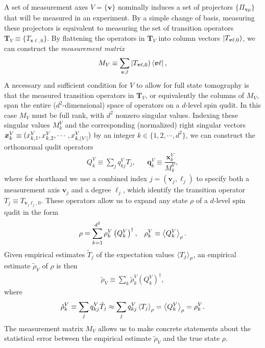 \documentclass[notitlepage,twocolumn]{revtex4-2}
\newcommand{\f}[2]{\dfrac{#1}{#2}} %
\newcommand{\p}[1]{\left(#1\right)} %
\newcommand{\bk}{\Braket} %
\renewcommand{\v}{\bm} %
\renewcommand{\set}[1]{\{#1\}} %
\def\oket#1{\mathinner{|{#1})}}
\begin{document}
A set of measurement axes $V=\set{\v v}$ nominally induces a set of projectors $\set{\Pi_{\v v\mu}}$ that will be measured in an experiment.
By a simple change of basis, measuring these projectors is equivalent to measuring the set of transition operators $\v T_V\equiv\set{T_{\v v\ell,0}}$.
By flattening the operators in $\v T_V$ into column vectors $\oket{T_{\v v\ell,0}}$, we can construct the {\it measurement matrix}
\begin{align}
  M_V \equiv \sum_{\v v,\ell} \oket{T_{\v v\ell,0}} \bra{\v v\ell},
  \label{eq:meas_mat}
\end{align}
A necessary and sufficient condition for $V$ to allow for full state tomography is that the measured transition operators in $\v T_V$, or equivalently the columns of $M_V$, span the entire ($d^2$-dimensional) space of operators on a $d$-level spin qudit.
In this case $M_V$ must be full rank, with $d^2$ nonzero singular values.
Indexing these singular values $M^V_k$ and the corresponding (normalized) right singular vectors $\v x^V_k\equiv(x^V_{k,1},x^V_{k,2},\cdots,x^V_{k,\abs{V}})$ by an integer $k\in\set{1,2,\cdots,d^2}$, we can construct the orthonormal qudit operators
\begin{align}
  Q^V_k \equiv \sum_j q^V_{kj} T_j,
  &&
  \v q^V_k \equiv \f{\v x^V_k}{M^V_k},
\end{align}
where for shorthand we use a combined index $j=\p{\v v_j,\ell_j}$ to specify both a measurement axis $\v v_j$ and a degree $\ell_j$, which identify the transition operator $T_j\equiv T_{\v v_j\ell_j,0}$.
These operators allow us to expand any state $\rho$ of a $d$-level spin qudit in the form
\begin{align}
  \rho = \sum_{k=1}^{d^2} \rho_k^V \p{Q_k^V}^\dag,
  &&
  \rho_k^V \equiv \bk{Q^V_k}_\rho.
\end{align}
Given empirical estimates $\tilde T_j$ of the expectation values $\bk{T_j}_\rho$, an empirical estimate $\tilde\rho_V$ of $\rho$ is then
\begin{align}
  \tilde\rho_V \equiv \sum_k \tilde\rho^V_k \p{Q^V_k}^\dag,
  \label{eq:reconstructed_state}
\end{align}
where
\begin{align}
  \tilde\rho^V_k \equiv \sum_j q^V_{kj} \tilde T_j
  \approx \sum_j q^V_{kj} \bk{T_j}_\rho
  = \bk{Q^V_k}_\rho
  = \rho^V_k.
\end{align}
The measurement matrix $M_V$ allows us to make concrete statements about the statistical error between the empirical estimate $\tilde\rho_V$ and the true state $\rho$.
\end{document}

